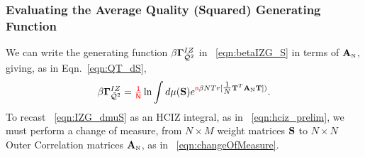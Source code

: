 %



\subsubsection{Evaluating the Average Quality (Squared) Generating Function }
\label{sxn:matgen_quality_hciz_B}

We can write the generating function $\beta\mathbf{\Gamma}^{IZ}_{\bar{\mathcal{Q}}^{2}}$ 
in \EQN~\ref{eqn:betaIZG_S} 
in terms of ${\mathbf{A}}_{\text{\tiny N}}$, giving, as in Eqn.~\ref{eqn:QT_dS}, 
\begin{align}
  \label{eqn:IZG_dmuS}
  \beta\mathbf{\Gamma}^{IZ}_{\bar{\mathcal{Q}}^{2}} = {\color{red}\sf{\tfrac{1}{N}}}\ln \int d\mu({\mathbf{S}})  e^{ {\color{red}\sf{n}}\beta N Tr[\tfrac{1}{N}{\mathbf{T}}^T{\mathbf{A}}_{\text{\tiny N}}{\mathbf{T}}]) }  .
\end{align}
To recast \EQN~\ref{eqn:IZG_dmuS} as an HCIZ integral, as in \EQN~\ref{eqn:hciz_prelim},
we must perform a change of measure,
 from $N\times M$ \Student weight matrices ${\mathbf{S}}$ to $N\times N$ Outer \Student Correlation matrices ${\mathbf{A}}_{\text{\tiny N}}$, as in \EQN~\ref{eqn:changeOfMeasure}.

